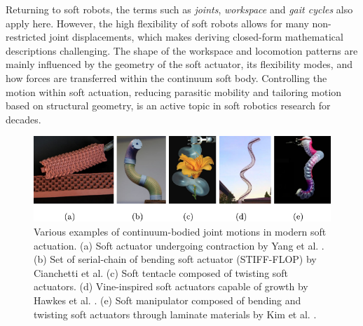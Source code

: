 Returning to soft robots, the terms such as \textit{joints}, \textit{workspace} and \textit{gait cycles} also apply here. However, the high flexibility of soft robots allows for many non-restricted joint displacements, which makes deriving closed-form mathematical descriptions challenging. The shape of the workspace and locomotion patterns are mainly influenced by the geometry of the soft actuator, its flexibility modes, and how forces are transferred within the continuum soft body. Controlling the motion within soft actuation, reducing parasitic mobility and tailoring motion based on structural geometry, is an active topic in soft robotics research for decades. \\

\begin{figure}[!t]
  \centering
  \includegraphics*[width=\textwidth]{./pdf/thesis-figurex-1-2.pdf}
  \vspace{-6mm}
  \caption{Various examples of continuum-bodied joint motions in modern soft actuation. (a) Soft actuator undergoing contraction by Yang et al. \cite{Yang2016}. (b) Set of serial-chain of bending soft actuator (STIFF-FLOP) by Cianchetti et al. \cite{Cianchetti2013Nov,Cianchetti2014} (c) Soft tentacle composed of twisting soft actuators. (d) Vine-inspired soft actuators capable of growth by Hawkes et al. \cite{Hawkes2017}. (e) Soft manipulator composed of bending and twisting soft actuators through laminate materials by Kim et al. \cite{Kim2019Aug}.}
  \label{fig:C0:actuationtypes}
\end{figure}
%
\vspace{-4mm}
